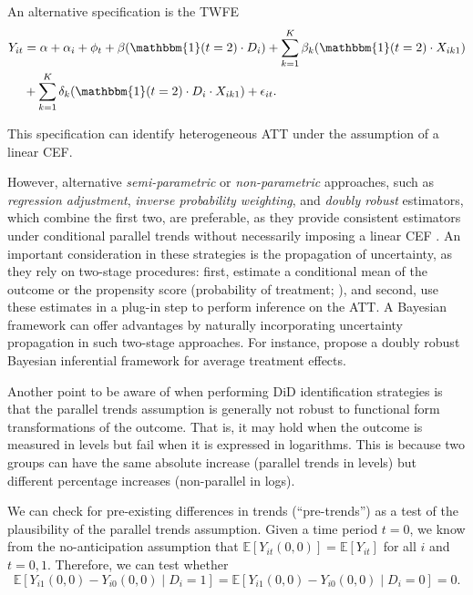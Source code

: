 An alternative specification is the TWFE
\begin{align*}
	Y_{it} & = \alpha + \alpha_i + \phi_t + \beta (\mathbbm{1}(t=2)\cdot D_i) +   \sum_{k=1}^K \beta_k (\mathbbm{1}(t=2)\cdot X_{ik1})\\
	& +  \sum_{k=1}^K \delta_k (\mathbbm{1}(t=2)\cdot D_i \cdot X_{ik1}) + \epsilon_{it}.
\end{align*}

This specification can identify heterogeneous ATT under the assumption of a linear CEF.


However, alternative \textit{semi-parametric} or \textit{non-parametric} approaches, such as \textit{regression adjustment}, \textit{inverse probability weighting}, and \textit{doubly robust} estimators, which combine the first two, are preferable, as they provide consistent estimators under conditional parallel trends without necessarily imposing a linear CEF \cite{abadie2005semiparametric,roth2023whats}. An important consideration in these strategies is the propagation of uncertainty, as they rely on two-stage procedures: first, estimate a conditional mean of the outcome or the propensity score (probability of treatment; \cite{rosenbaum1983central}), and second, use these estimates in a plug-in step to perform inference on the ATT. A Bayesian framework can offer advantages by naturally incorporating uncertainty propagation in such two-stage approaches. For instance, \cite{SaarelaBelzileStephens2016,YiuGoudieTom2020,LuoGrahamMcCoy2023,breunig2025double} propose a doubly robust Bayesian inferential framework for average treatment effects.

Another point to be aware of when performing DiD identification strategies is that the parallel trends assumption is generally not robust to functional form transformations of the outcome. That is, it may hold when the outcome is measured in levels but fail when it is expressed in logarithms. This is because two groups can have the same absolute increase (parallel trends in levels) but different percentage increases (non-parallel in logs).

We can check for pre-existing differences in trends (``pre-trends'') as a test of the plausibility of the parallel trends assumption. Given a time period $t = 0$, we know from the no-anticipation assumption that $\mathbb{E}[Y_{it}(0,0)] = \mathbb{E}[Y_{it}]$ for all $i$ and $t = 0,1$. Therefore, we can test whether  
\begin{equation}
	\mathbb{E}[Y_{i1}(0,0) - Y_{i0}(0,0) \mid D_i = 1] 
	= \mathbb{E}[Y_{i1}(0,0) - Y_{i0}(0,0) \mid D_i = 0] = 0.
\end{equation}


